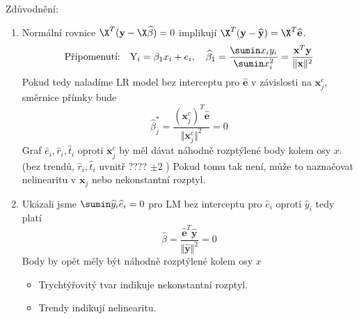 \begin{remark}
Zdůvodnění:
\begin{enumerate}
\item Normální rovnice $ \X ^{T} ( \textbf{y} - \X \widehat{\beta} ) = 0 $ implikují $ \X ^{T} ( \textbf{y} - \widehat{\textbf{y}}) = \X ^T \widehat{\textbf{e}} $.
$$
 \text{Připomenutí:} \quad \text{Y}_i = \beta_1 x_i + e_i , \quad \widehat{\beta}_1 = \dfrac{\sumin x_i y_i}{\sumin x_i^{2}} = \frac{\textbf{x}^{T}\textbf{y}}{\Vert \textbf{x} \Vert ^2 }
$$
Pokud tedy naladíme LR model bez interceptu pro $ \widehat{\textbf{e}} $ v závislosti na $ \textbf{x}_j^c $, směrnice přímky bude
$$
  \widehat{\beta}_j^* = \frac{(\textbf{x}_j^c)^T \widehat{\textbf{e}}}{\Vert \textbf{x}_j^c \Vert ^2} = 0
$$
Graf $ \widehat{e}_i , \widehat{r}_i , \widehat{t}_i $ oproti $ \textbf{x}_j^c $ by měl dávat náhodně rozptýlené body kolem osy $ x $. (bez trendů, $  \widehat{r}_i , \widehat{t}_i $ uvnitř ???? $\pm 2$ )
Pokud tomu tak není, může to naznačovat nelinearitu v $ \textbf{x}_j $ nebo nekonstantní rozptyl.
\item Ukázali jsme $ \sumin \widehat{y}_i \widehat{e}_i = 0 $ pro LM bez interceptu pro $ \widehat{e}_i $ oproti $ \widehat{y}_i $ tedy platí
$$
  \widehat{\beta} = \frac{\widehat{\textbf{e}}^T \widehat{\textbf{y}}}{\Vert \widehat{\textbf{y}} \Vert ^2} = 0
$$
Body by opět měly být náhodně rozptýlené kolem osy $ x $
\begin{itemize}
\item Trychtýřovitý tvar indikuje nekonstantní rozptyl.
\item Trendy indikují nelinearitu.
\end{itemize}
\end{enumerate}	
\end{remark}


